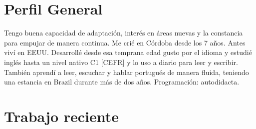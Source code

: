 \documentclass[a4paper,hidelinks]{twentysecondcv} %
\begin{document}

\makeprofile %

\vfill 


% 


\section{Perfil General}


Tengo buena capacidad de adaptación, interés en áreas nuevas y la constancia para empujar de manera continua. Me crié en Córdoba desde los 7 años. Antes viví en EEUU. Desarrollé desde esa temprana edad gusto por el idioma y estudié inglés hasta un nivel nativo C1 [CEFR] y lo uso a diario para leer y escribir. También aprendí a leer, escuchar y hablar portugués de manera fluida, teniendo una estancia en Brazil durante más de dos años. Programación: autodidacta.\\

\section{Trabajo reciente}

\begin{twentyshort} %
\end{twentyshort}
\end{document}
